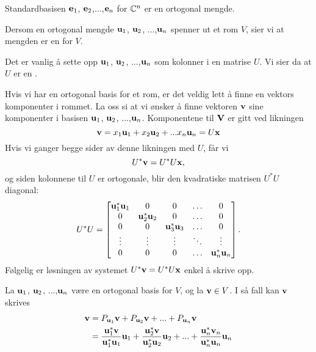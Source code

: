 \begin{ex}
Standardbasisen $\mathbf{e}_1$, $\mathbf{e}_2$,...,$\mathbf{e}_n$ for $\mathbb{C}^n$ er en ortogonal mengde.
\end{ex}

\begin{defnx}
Dersom en ortogonal mengde $\mathbf{u}_1$, $\mathbf{u} _2$, ...,$\mathbf{u}_n$ spenner ut et rom $V$, sier vi at mengden er en  for $V$.
\end{defnx}
\begin{defnx}
Det er vanlig å sette opp $\mathbf{u}_1$, $\mathbf{u} _2$, ...,$\mathbf{u}_n$ som kolonner i en matrise $U$. Vi sier da at $U$ er en .
\end{defnx}
%
%

Hvis vi har en ortogonal basis for et rom, er det veldig lett å finne en vektors komponenter i rommet. La oss si at vi ønsker å finne vektoren $\mathbf{v}$ sine komponenter i basisen $\mathbf{u}_1$, $\mathbf{u} _2$, ...,$\mathbf{u}_n$. Komponentene til $\mathbf{V}$ er gitt ved likningen 
\[
\mathbf{v} = x_1 \mathbf{u}_1 + x_2 \mathbf{u}_2 + ...x_n \mathbf{u}_n = U\mathbf{x}
\]
Hvis vi ganger begge sider av denne likningen med $U$, får vi
\[
U^* \mathbf{v} = U^*U\mathbf{x},
\]
og siden kolonnene til $U$ er ortogonale, blir den kvadratiske matrisen $U^*U$ diagonal:
\[
U^*U=
\begin{bmatrix}
\mathbf{u}_1^*\mathbf{u}_1 & 0 & 0 & \hdots & 0 \\
0 & \mathbf{u}_2^*\mathbf{u}_2 & 0 & \hdots & 0 \\
0 & 0 & \mathbf{u}_3^*\mathbf{u}_3  & \hdots & 0 \\
\vdots & \vdots & \vdots & \ddots & \vdots\\
0 & 0 & 0 & \hdots & \mathbf{u}_n^*\mathbf{u}_n
\end{bmatrix}.
\]
Følgelig er løsningen av systemet $U^* \mathbf{v} = U^*U\mathbf{x}$ enkel å skrive opp. 
\begin{thm}
La $\mathbf{u}_1$, $\mathbf{u} _2$, ...,$\mathbf{u}_n$ være en ortogonal basis for $V$, og la $\mathbf{v} \in V$. 
I så fall kan $\mathbf{v}$ skrives
\begin{align*}
\mathbf{v}&= P_{\mathbf{u}_1} \mathbf{v} + P_{\mathbf{u}_2} \mathbf{v} + ... +P_{\mathbf{u}_n} \mathbf{v}\\ &= \frac{\mathbf{u}_1^*\mathbf{v}}{\mathbf{u}_1^*\mathbf{u}_1}\mathbf{u}_1 + \frac{\mathbf{u}_2^*\mathbf{v}}{\mathbf{u}_2^*\mathbf{u}_2}\mathbf{u}_2+...+\frac{\mathbf{u}_n^*\mathbf{v}_n}{\mathbf{u}_n^*\mathbf{u}_n}\mathbf{u}_n
\end{align*}
\end{thm}


